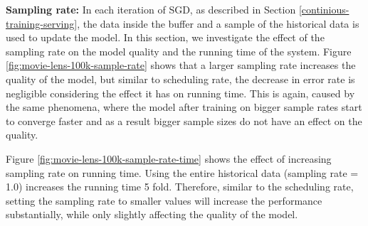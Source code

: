 \documentclass{vldb}
\begin{document}
\textbf{Sampling rate:} In each iteration of SGD, as described in Section \ref{continious-training-serving}, the data inside the buffer and a sample of the historical data is used to update the model.
In this section, we investigate the effect of the sampling rate on the model quality and the running time of the system.
Figure \ref{fig:movie-lens-100k-sample-rate} shows that a larger sampling rate increases the quality of the model, but similar to scheduling rate, the decrease in error rate is negligible considering the effect it has on running time. 
This is again, caused by the same phenomena, where the model after training on bigger sample rates start to converge faster and as a result bigger sample sizes do not have an effect on the quality.
 
Figure \ref{fig:movie-lens-100k-sample-rate-time} shows the effect of increasing sampling rate on running time.
Using the entire historical data (sampling rate = 1.0) increases the running time 5 fold. 
Therefore, similar to the scheduling rate, setting the sampling rate to smaller values will increase the performance substantially, while only slightly affecting the quality of the model.
\end{document}
